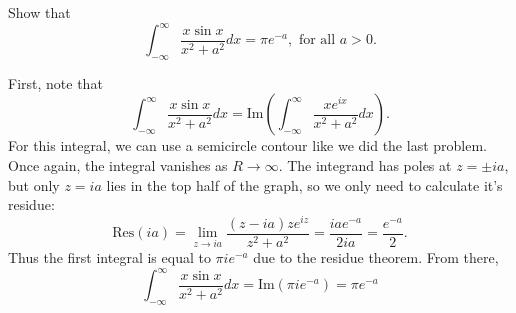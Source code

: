 \documentclass[12pt]{article}
\begin{document}

\begin{statement}[4]
  Show that 
  $$ \int^{\infty}_{-\infty} \frac{x \sin x}{x^2 + a^2} dx = \pi e^{-a}, \text{ for all } a > 0. $$
\end{statement}
\begin{newproof}
    First, note that 
    $$ \int^{\infty}_{-\infty} \frac{x \sin x}{x^2 + a^2} dx = \text{Im}\left(\int^{\infty}_{-\infty} \frac{xe^{ix}}{x^2+a^2}dx\right). $$
    For this integral, we can use a semicircle contour like we did the last problem. Once again, the integral vanishes as $R \to \infty$. The integrand has poles at $z=\pm ia$, but only $z=ia$ lies in the top half of the graph, so we only need to calculate it's residue:
    $$ \text{Res}(ia)=\lim_{z \to ia} \frac{(z-ia)ze^{iz}}{z^2+a^2} = \frac{iae^{-a}}{2ia}=\frac{e^{-a}}{2}.$$
    Thus the first integral is equal to $\pi i e^{-a}$ due to the residue theorem. From there, 
    $$ \int^{\infty}_{-\infty} \frac{x \sin x}{x^2 + a^2} dx = \text{Im}(\pi i e^{-a})=\pi e^{-a} $$
\end{newproof}

\end{document}
